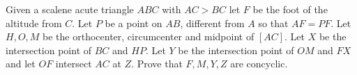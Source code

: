 Given a scalene acute triangle $ ABC$ with $ AC>BC$ let $ F$ be the foot of the altitude from $ C$. Let $ P$ be a point on $ AB$,  different from $ A$ so that $ AF=PF$. Let $ H,O,M$ be the orthocenter, circumcenter and midpoint of $ [AC]$. Let $ X$ be the intersection point of $ BC$ and $ HP$. Let $ Y$ be the intersection point of $ OM$ and $ FX$ and let $ OF$ intersect $ AC$ at $ Z$. Prove that $ F,M,Y,Z$ are concyclic.